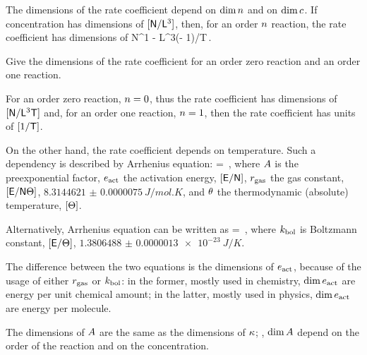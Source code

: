 The dimensions of the rate coefficient depend on $\dim n$ and on $\dim\conc{}$. If concentration has dimensions of $[\mathsf{N}/\mathsf{L}^3]$, then, for an order $n$ reaction, the rate coefficient has dimensions of 
\beq
\phdim N^{1 - \rorder}\phdim L^{3(\rorder - 1)}/\phdim T\,.
\eeq

\begin{example}
Give the dimensions of the rate coefficient for an order zero reaction and an order one reaction.
\end{example}

\begin{solution}
For an order zero reaction, $n = 0$, thus the rate coefficient has dimensions of $[\mathsf{N}/\mathsf{L}^3\mathsf{T}]$ and, for an order one reaction, $n = 1$, then the rate coefficient has units of $[1/\mathsf{T}]$.
\end{solution}

On the other hand, the rate coefficient depends on temperature. Such a dependency is described by Arrhenius equation:
\beq
\krcoeff\vat\temp = \freqfact\exp{}\,,
\eeq
where $A$ is the preexponential factor, $e_\text{act}$ the activation energy, $[\mathsf{E}/\mathsf{N}]$, $r_\text{gas}$ the gas constant, $[\mathsf{E}/\mathsf{N}\Theta]$, $\SI{8.3144621(75)}{J/mol.K}$, and $\theta$ the thermodynamic (absolute) temperature, $[\Theta]$.

Alternatively, Arrhenius equation can be written as
\beq
\krcoeff\vat\temp = \freqfact\exp{}\,,
\eeq
where $k_\text{bol}$ is Boltzmann constant, $[\mathsf{E}/\Theta]$, $\SI{1.3806488(13)e-23}{J/K}$.

The difference between the two equations is the dimensions of $e_\text{act}$, because of the usage of either $r_\text{gas}$ or $k_\text{bol}$: in the former, mostly used in chemistry, $\dim e_\text{act}$ are energy per unit chemical amount; in the latter, mostly used in physics, $\dim e_\text{act}$ are energy per molecule.

The dimensions of $A$ are the same as the dimensions of $\kappa$; \ie, $\dim A$ depend on the order of the reaction and on the concentration.
